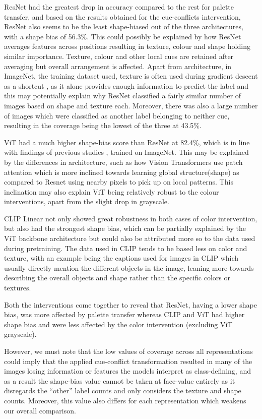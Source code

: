 \documentclass{article}
\begin{document}
ResNet had the greatest drop in accuracy compared to the rest for palette transfer, and based on the results obtained for the cue-conflicts intervention, ResNet also seems to be the least shape-biased out of the three architectures, with a shape bias of 56.3\%. This could possibly be explained by how ResNet averages features across positions resulting in texture, colour and shape holding similar importance. Texture, colour and other local cues are retained after averaging but overall arrangement is affected. Apart from architecture, in ImageNet, the training dataset used, texture is often used during gradient descent as a shortcut \citep{geirhos2019imagenet}, as it alone provides enough information to predict the label and this may potentially explain why ResNet classified a fairly similar number of images based on shape and texture each. Moreover, there was also a large number of images which were classified as another label belonging to neither cue, resulting in the coverage being the lowest of the three at 43.5\%. 


ViT had a much higher shape-bias score than ResNet at 82.4\%, which is in line with findings of previous studies \citep{tuli2021,naseer2021}, trained on ImageNet. This may be explained by the differences in architecture, such as how Vision Transformers use patch attention which is more inclined towards learning global structure(shape) as compared to Resnet using nearby pixels to pick up on local patterns. This inclination may also explain ViT being relatively robust to the colour interventions, apart from the slight drop in grayscale.

CLIP Linear not only showed great robustness in both cases of color intervention, but also had the strongest shape bias, which can be partially explained by the ViT backbone architecture but could also be attributed more so to the data used during pretraining. The data used in CLIP tends to be based less on color and texture, with an example being the captions used for images in CLIP which usually directly mention the different objects in the image, leaning more towards describing the overall objects and shape rather than the specific colors or textures. 

Both the interventions come together to reveal that ResNet, having a lower shape bias, was more affected by palette transfer whereas CLIP and ViT had higher shape bias and were less affected by the color intervention (excluding ViT grayscale).

However, we must note that the low values of coverage across all representations could imply that the applied cue-conflict transformation resulted in many of the images losing information or features the models interpret as class-defining, and as a result the shape-bias value cannot be taken at face-value entirely as it disregards the ``other'' label counts and only considers the texture and shape counts. Moreover, this value also differs for each representation which weakens our overall comparison.
\end{document}
